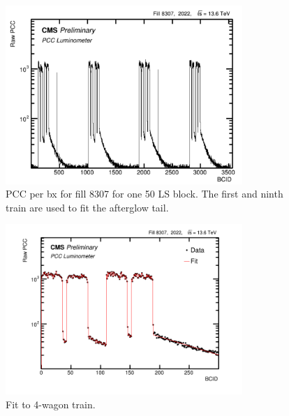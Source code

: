 \begin{figure}[!htp]
\centering
\includegraphics[width=0.8\textwidth]{ashish_thesis/run_361957_ls_block_1.png}
\caption[Raw PCC Run 361957]{%
 PCC per bx for fill 8307 for one 50 LS block. The first and ninth train are used to fit the afterglow tail.
}
\label{fig:period_bound_101}
\end{figure}

\begin{figure}[!htp]
\centering
\includegraphics[width=0.8\textwidth]{ashish_thesis/afterglow_fit_2022_1.png}
\caption[Afterglow Fit 4-wagon]{%
 Fit to 4-wagon train.
}
\label{fig:period_bound_102}
\end{figure}

